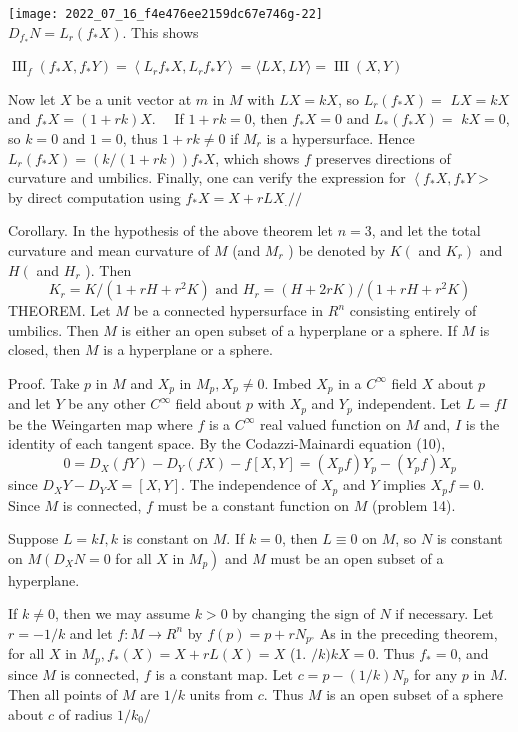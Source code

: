 \documentclass[10pt]{article}
\begin{document}
\texttt{[image: 2022\_07\_16\_f4e476ee2159dc67e746g-22]}\\
$D_{f_{*}} N=L_{r}\left(f_{*} X\right)$. This shows

$\operatorname{III}_{f}\left(f_{*} X, f_{*} Y\right)=\left\langle L_{r} f_{*} X, L_{r} f_{*} Y\right\rangle=\langle L X, L Y\rangle=\operatorname{III}(X, Y)$

Now let $X$ be a unit vector at $m$ in $M$ with $L X=k X$, so $L_{r}\left(f_{*} X\right)=$ $L X=k X$ and $f_{*} X=(1+r k) X . \quad$ If $1+r k=0$, then $f_{*} X=0$ and $L_{*}\left(f_{*} X\right)=$ $k X=0$, so $k=0$ and $1=0$, thus $1+r k \neq 0$ if $M_{r}$ is a hypersurface. Hence $L_{r}\left(f_{*} X\right)=(k /(1+r k)) f_{*} X$, which shows $f$ preserves directions of curvature and umbilics. Finally, one can verify the expression for $\left\langle f_{*} X, f_{*} Y>\right.$ by direct computation using $f_{*} X=X+r L X_{.} / /$

Corollary. In the hypothesis of the above theorem let $n=3$, and let the total curvature and mean curvature of $M$ (and $M_{r}$ ) be denoted by $K\left(\right.$ and $\left.K_{r}\right)$ and $H\left(\right.$ and $H_{r}$ ). Then
$$
K_{r}=K /\left(1+r H+r^{2} K\right) \text { and } H_{r}=(H+2 r K) /\left(1+r H+r^{2} K\right)
$$
THEOREM. Let $M$ be a connected hypersurface in $R^{n}$ consisting entirely of umbilics. Then $M$ is either an open subset of a hyperplane or a sphere. If $M$ is closed, then $M$ is a hyperplane or a sphere.

Proof. Take $p$ in $M$ and $X_{p}$ in $M_{p}, X_{p} \neq 0 .$ Imbed $X_{p}$ in a $C^{\infty}$ field $X$ about $p$ and let $Y$ be any other $C^{\infty}$ field about $p$ with $X_{p}$ and $Y_{p}$ independent. Let $L=f I$ be the Weingarten map where $f$ is a $C^{\infty}$ real valued function on $M$ and, $I$ is the identity of each tangent space. By the Codazzi-Mainardi equation (10),
$$
0=D_{X}(f Y)-D_{Y}(f X)-f[X, Y]=\left(X_{p} f\right) Y_{p}-\left(Y_{p} f\right) X_{p}
$$
since $D_{X} Y-D_{Y} X=[X, Y]$. The independence of $X_{p}$ and $Y$ implies $X_{p} f=0 .$ Since $M$ is connected, $f$ must be a constant function on $M$ (problem 14).

Suppose $L=k I, k$ is constant on $M$. If $k=0$, then $L \equiv 0$ on $M$, so $N$ is constant on $M\left(D_{X} N=0\right.$ for all $X$ in $\left.M_{p}\right)$ and $M$ must be an open subset of a hyperplane.

If $k \neq 0$, then we may assume $k>0$ by changing the sign of $N$ if necessary. Let $r=-1 / k$ and let $f: M \rightarrow R^{n}$ by $f(p)=p+r N_{p^{\circ}}$ As in the preceding theorem, for all $X$ in $M_{p}, f_{*}(X)=X+r L(X)=X$ (1. $/ k) k X=0$. Thus $f_{*}=0$, and since $M$ is connected, $f$ is a constant map. Let $c=p-(1 / k) N_{p}$ for any $p$ in $M$. Then all points of $M$ are $1 / k$ units from $c$. Thus $M$ is an open subset of a sphere about $c$ of radius $1 / k_{0} /$
\end{document}
